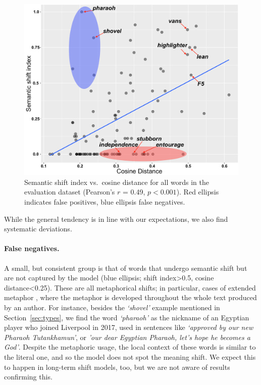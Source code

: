 \begin{figure}[t]\centering
\includegraphics[width=\columnwidth]{images/cosine_distance_shift_index_annotated_3.png}
\caption{Semantic shift index vs.~cosine distance for all words in the evaluation dataset (Pearson's $r$ = 0.49, $p< 0.001$). 
Red ellipsis indicates false positives, blue ellipsis false
negatives.
\label{fig:shift-cosine}}
\end{figure}


While the general tendency is in line with our expectations, we
also find systematic deviations. 

\paragraph{False negatives.}
A small, but consistent group is that of %
words that undergo semantic shift but are not captured by the model
(blue ellipsis; shift index\textgreater 0.5, cosine distance\textless 0.25).
These are all metaphorical shifts; in particular, cases of extended
metaphor \cite{werth1994extended}, where the metaphor is 
developed throughout the whole text produced by an author. For instance, besides the {\em `shovel'} example mentioned in Section~\ref{sec:types}, we find the word {\em `pharaoh'} as the nickname of an Egyptian player who
joined Liverpool in 2017, used in
sentences like \textit{`approved by our new Pharaoh Tutankhamun'}, or \textit{'our dear Egyptian Pharaoh, let's hope he becomes a God'}.
Despite the metaphoric usage, the local context of these words is similar to the literal one, and so the model does not spot the meaning shift. We expect this to happen in long-term shift models, too, but we are not aware of results confirming this.


